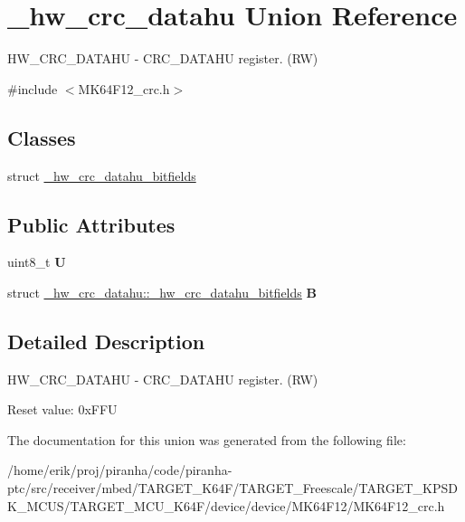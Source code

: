 \hypertarget{union__hw__crc__datahu}{}\section{\+\_\+hw\+\_\+crc\+\_\+datahu Union Reference}
\label{union__hw__crc__datahu}


H\+W\+\_\+\+C\+R\+C\+\_\+\+D\+A\+T\+A\+HU -\/ C\+R\+C\+\_\+\+D\+A\+T\+A\+HU register. (RW)  




{\ttfamily \#include $<$M\+K64\+F12\+\_\+crc.\+h$>$}

\subsection*{Classes}
\begin{DoxyCompactItemize}
\item 
struct \hyperlink{struct__hw__crc__datahu_1_1__hw__crc__datahu__bitfields}{\+\_\+hw\+\_\+crc\+\_\+datahu\+\_\+bitfields}
\end{DoxyCompactItemize}
\subsection*{Public Attributes}
\begin{DoxyCompactItemize}
\item 
uint8\+\_\+t {\bfseries U}\hypertarget{union__hw__crc__datahu_af76418cdc9f027cfdaea2634ab60d73e}{}\label{union__hw__crc__datahu_af76418cdc9f027cfdaea2634ab60d73e}

\item 
struct \hyperlink{struct__hw__crc__datahu_1_1__hw__crc__datahu__bitfields}{\+\_\+hw\+\_\+crc\+\_\+datahu\+::\+\_\+hw\+\_\+crc\+\_\+datahu\+\_\+bitfields} {\bfseries B}\hypertarget{union__hw__crc__datahu_a82d5fd38fe64fc3f7b858fc4a7a20567}{}\label{union__hw__crc__datahu_a82d5fd38fe64fc3f7b858fc4a7a20567}

\end{DoxyCompactItemize}


\subsection{Detailed Description}
H\+W\+\_\+\+C\+R\+C\+\_\+\+D\+A\+T\+A\+HU -\/ C\+R\+C\+\_\+\+D\+A\+T\+A\+HU register. (RW) 

Reset value\+: 0x\+F\+FU 

The documentation for this union was generated from the following file\+:\begin{DoxyCompactItemize}
\item 
/home/erik/proj/piranha/code/piranha-\/ptc/src/receiver/mbed/\+T\+A\+R\+G\+E\+T\+\_\+\+K64\+F/\+T\+A\+R\+G\+E\+T\+\_\+\+Freescale/\+T\+A\+R\+G\+E\+T\+\_\+\+K\+P\+S\+D\+K\+\_\+\+M\+C\+U\+S/\+T\+A\+R\+G\+E\+T\+\_\+\+M\+C\+U\+\_\+\+K64\+F/device/device/\+M\+K64\+F12/M\+K64\+F12\+\_\+crc.\+h\end{DoxyCompactItemize}
